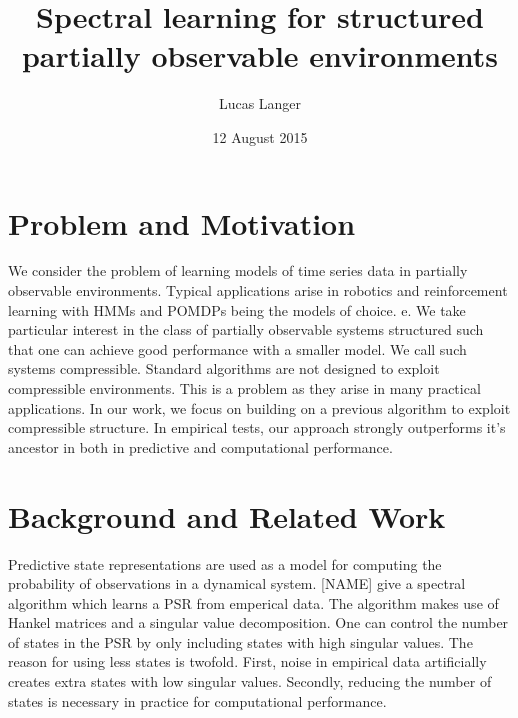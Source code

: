 \documentclass{acm_proc_article-sp}
\begin{document}
\title{Spectral learning for structured partially observable environments}


\author{
\alignauthor
Lucas Langer\\
}

\date{12 August 2015}

\maketitle

\section{Problem and Motivation}

We consider the problem of learning models of time series data in partially observable environments. Typical applications arise in robotics and reinforcement learning with HMMs and POMDPs being the models of choice.
e. We take particular interest in the class of partially observable systems structured such that one can achieve good performance with a smaller model. We call such systems compressible. Standard algorithms are not designed to exploit compressible environments. This is a problem as they arise in many practical applications. In our work, we focus on building on a previous algorithm to exploit compressible structure. In empirical tests, our approach strongly outperforms it's ancestor in both in predictive and computational performance.

\section{Background and Related Work}

Predictive state representations are used as a model for computing the probability of observations in a dynamical system. [NAME] give a spectral algorithm which learns a PSR from emperical data. The algorithm makes use of Hankel matrices and a singular value decomposition. One can control the number of states in the PSR by only including states with high singular values. The reason for using less states is twofold. First, noise in empirical data artificially creates extra states with low singular values. Secondly, reducing the number of states is necessary in practice for computational performance. 

\end{document}
